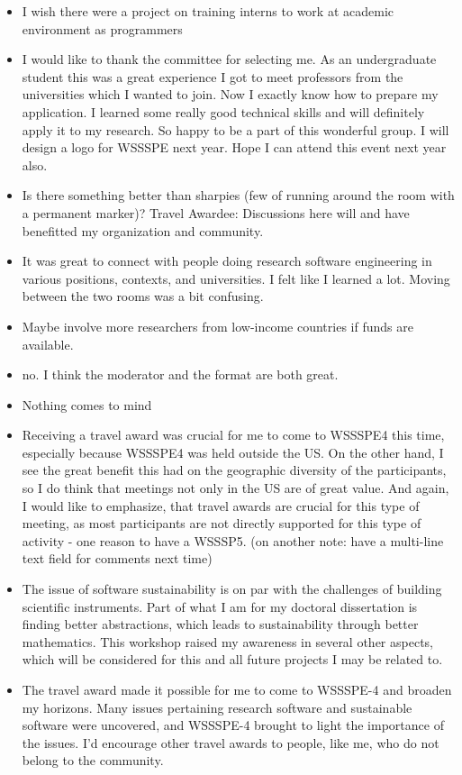 \begin{itemize}
\item I wish there were a project on training interns to work at academic environment as programmers
\item I would like to thank the committee for selecting me. As an undergraduate student this was a great experience I got to meet professors from the universities which I wanted to join. Now I exactly know how to prepare my application. I learned some really good technical skills and will definitely apply it to my research. So happy to be a part of this wonderful group. I will design a  logo for WSSSPE next year. Hope I can attend this event next year also.  
\item Is there something better than sharpies (few of running around the room with a permanent marker)? Travel Awardee: Discussions here will and have benefitted my organization and community.
\item It was great to connect with people doing research software engineering in various positions, contexts, and universities. I felt like I learned a lot. Moving between the two rooms was a bit confusing.
\item Maybe involve more researchers from low-income countries if funds are available.
\item no. I think the moderator and the format are both great.
\item Nothing comes to mind
\item Receiving a travel award was crucial for me to come to WSSSPE4 this time, especially because WSSSPE4 was held outside the US. On the other hand, I see the great benefit this had on the geographic diversity of the participants, so I do think that meetings not only in the US are of great value. And again, I would like to emphasize, that travel awards are crucial for this type of meeting, as most participants are not directly supported for this type of activity - one reason to have a WSSSP5. (on another note: have a multi-line text field for comments next time)
\item The issue of software sustainability is on par with the challenges of building scientific instruments. Part of what I am for my doctoral dissertation is finding better abstractions, which leads to sustainability through better mathematics. This workshop raised my awareness in several other aspects, which will be considered for this and all future projects I may be related to.
\item The travel award made it possible for me to come to WSSSPE-4 and broaden my horizons.  Many issues pertaining research software and sustainable software were uncovered, and WSSSPE-4 brought to light the importance of the issues.  I'd encourage other travel awards to people, like me, who do not belong to the community.

\end{itemize}
